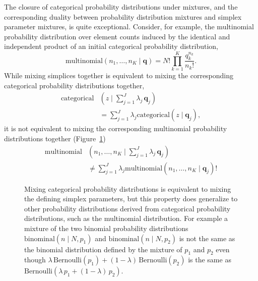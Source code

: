 \documentclass[
  letterpaper,
  DIV=11,
  numbers=noendperiod]{scrartcl}
\begin{document}
The closure of categorical probability distributions under mixtures, and
the corresponding duality between probability distribution mixtures and
simplex parameter mixtures, is quite exceptional. Consider, for example,
the multinomial probability distribution over element counts induced by
the identical and independent product of an initial categorical
probability distribution, \[
\mathrm{multinomial}( n_{1}, \ldots, n_{K} \mid \mathbf{q})
=
N! \prod_{k = 1}^{K} \frac{ q_{k}^{n_{k}} }{ n_{k}! }.
\] While mixing simplices together is equivalent to mixing the
corresponding categorical probability distributions together,
\begin{align*}
\mathrm{categorical} & ( z \mid
\textstyle \sum_{j = 1}^{J} \lambda_{j} \, \mathbf{q}_{j} )
\\
&=
\sum_{j = 1}^{J}
\lambda_{j} \mathrm{categorical}( z \mid \mathbf{q}_{j} ),
\end{align*} it is not equivalent to mixing the corresponding
multinomial probability distributions together
(Figure~\ref{fig-binomial}) \begin{align*}
\mathrm{multinomial} & ( n_{1}, \ldots, n_{K} \mid
\textstyle \sum_{j = 1}^{J} \lambda_{j} \, \mathbf{q}_{j} )
\\
&\ne
\sum_{j = 1}^{J} \lambda_{j}
\mathrm{multinomial}( n_{1}, \ldots, n_{K} \mid \mathbf{q}_{j})!
\end{align*}

\begin{figure}


\caption{\label{fig-binomial}Mixing categorical probability
distributions is equivalent to mixing the defining simplex parameters,
but this property does generalize to other probability distributions
derived from categorical probability distributions, such as the
multinomial distribution. For example a mixture of the two binomial
probability distributions \(\mathrm{binominal}(n \mid N, p_{1})\) and
\(\mathrm{binominal}(n \mid N, p_{2})\) is not the same as the binomial
distribution defined by the mixture of \(p_{1}\) and \(p_{2}\) even
though
\(\lambda \, \mathrm{Bernoulli}(p_{1}) + (1 - \lambda) \, \mathrm{Bernoulli}(p_{2})\)
is the same as
\(\mathrm{Bernoulli}(\lambda \, p_{1} + (1 - \lambda) \, p_{2})\).}

\end{figure}%
\end{document}
